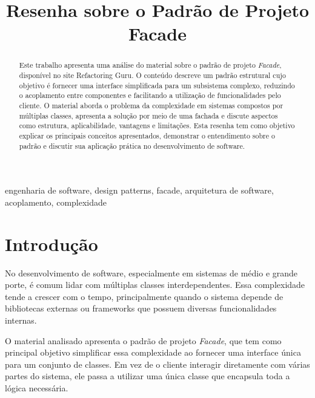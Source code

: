 \documentclass[conference]{IEEEtran}
\begin{document}
\title{Resenha sobre o Padrão de Projeto Facade}

\author{
}

\maketitle

\begin{abstract}

Este trabalho apresenta uma análise do material sobre o padrão de projeto \textit{Facade}, disponível no site Refactoring Guru. O conteúdo descreve um padrão estrutural cujo objetivo é fornecer uma interface simplificada para um subsistema complexo, reduzindo o acoplamento entre componentes e facilitando a utilização de funcionalidades pelo cliente. O material aborda o problema da complexidade em sistemas compostos por múltiplas classes, apresenta a solução por meio de uma fachada e discute aspectos como estrutura, aplicabilidade, vantagens e limitações. Esta resenha tem como objetivo explicar os principais conceitos apresentados, demonstrar o entendimento sobre o padrão e discutir sua aplicação prática no desenvolvimento de software.

\end{abstract}

\begin{IEEEkeywords}
engenharia de software, design patterns, facade, arquitetura de software, acoplamento, complexidade
\end{IEEEkeywords}

\section{Introdução}

No desenvolvimento de software, especialmente em sistemas de médio e grande porte, é comum lidar com múltiplas classes interdependentes. Essa complexidade tende a crescer com o tempo, principalmente quando o sistema depende de bibliotecas externas ou frameworks que possuem diversas funcionalidades internas.

O material analisado apresenta o padrão de projeto \textit{Facade}, que tem como principal objetivo simplificar essa complexidade ao fornecer uma interface única para um conjunto de classes. Em vez de o cliente interagir diretamente com várias partes do sistema, ele passa a utilizar uma única classe que encapsula toda a lógica necessária.
\end{document}
